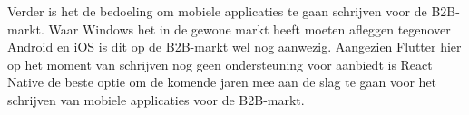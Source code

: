 Verder is het de bedoeling om mobiele applicaties te gaan schrijven voor de B2B-markt. Waar Windows het in de gewone markt heeft moeten afleggen tegenover Android en iOS is dit op de B2B-markt wel nog aanwezig. Aangezien Flutter hier op het moment van schrijven nog geen ondersteuning voor aanbiedt is React Native de beste optie om de komende jaren mee aan de slag te gaan voor het schrijven van mobiele applicaties voor de B2B-markt.





